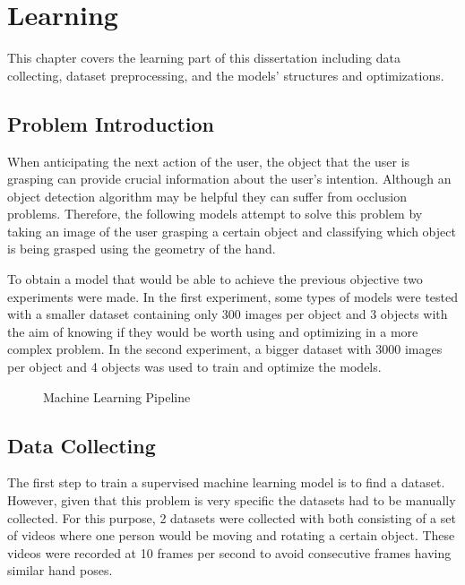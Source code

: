 \chapter{Learning}
\label{chapter:learning}

This chapter covers the learning part of this dissertation including data collecting, dataset preprocessing, and the models' structures and optimizations.

\section{Problem Introduction}

When anticipating the next action of the user, the object that the user is grasping can provide crucial information about the user's intention. Although an object detection algorithm may be helpful they can suffer from occlusion problems. Therefore, the following models attempt to solve this problem by taking an image of the user grasping a certain object and classifying which object is being grasped using the geometry of the hand.

To obtain a model that would be able to achieve the previous objective two experiments were made. In the first experiment, some types of models were tested with a smaller dataset containing only 300 images per object and 3 objects with the aim of knowing if they would be worth using and optimizing in a more complex problem. In the second experiment, a bigger dataset with 3000 images per object and 4 objects was used to train and optimize the models.

\begin{figure}[H]%
    \centering
    
    \caption{Machine Learning Pipeline}
    \label{fig:ml_pipeline}
\end{figure}


\section{Data Collecting}

The first step to train a supervised machine learning model is to find a dataset. However, given that this problem is very specific the datasets had to be manually collected. For this purpose, 2 datasets were collected with both consisting of a set of videos where one person would be moving and rotating a certain object. These videos were recorded at 10 frames per second to avoid consecutive frames having similar hand poses.

